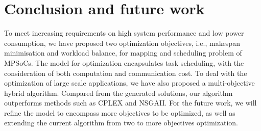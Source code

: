 \documentclass[conference]{IEEEtran}
\begin{document}










\section{Conclusion and future work\label{se:con}}
To meet increasing requirements on  high  system performance and low power consumption, we have proposed two optimization objectives, i.e., makespan minimisation and workload balance, for mapping and scheduling problem of MPSoCs. The model for optimization encapsulates task scheduling, with the consideration of both computation and communication cost. To deal with the optimization of large scale applications, we have also proposed a multi-objective hybrid algorithm. Compared from the generated solutions, our algorithm outperforms  methods such as CPLEX and NSGAII.  
For the future work, we will refine the model to encompass more objectives to be optimized, as well as extending the current algorithm from two to more objectives optimization.  


\end{document}
